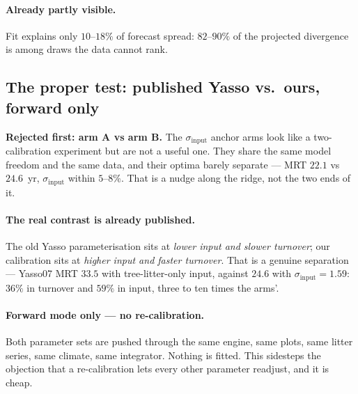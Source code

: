 \documentclass[11pt]{article}
\newcommand{\sinput}{\sigma_{\mathrm{input}}}
\begin{document}
\paragraph{Already partly visible.} Fit explains only $10$--$18\%$ of forecast spread: $82$--$90\%$
of the projected divergence is among draws the data cannot rank.

\subsection{The proper test: published Yasso vs.\ ours, forward only}
\begin{note}
\textbf{Rejected first: arm A vs arm B.} The $\sinput$ anchor arms look like a two-calibration
experiment but are not a useful one. They share the same model freedom and the same data, and their
optima barely separate --- MRT $22.1$ vs $24.6$~yr, $\sinput$ within $5$--$8\%$. That is a nudge
along the ridge, not the two ends of it.
\end{note}

\paragraph{The real contrast is already published.} The old Yasso parameterisation sits at
\emph{lower input and slower turnover}; our calibration sits at \emph{higher input and faster
turnover}. That is a genuine separation --- Yasso07 MRT $33.5$ with tree-litter-only input, against
$24.6$ with $\sinput = 1.59$: $36\%$ in turnover and $59\%$ in input, three to ten times the arms'.

\paragraph{Forward mode only --- no re-calibration.} Both parameter sets are pushed through the same
engine, same plots, same litter series, same climate, same integrator. Nothing is fitted. This
sidesteps the objection that a re-calibration lets every other parameter readjust, and it is cheap.
\end{document}
